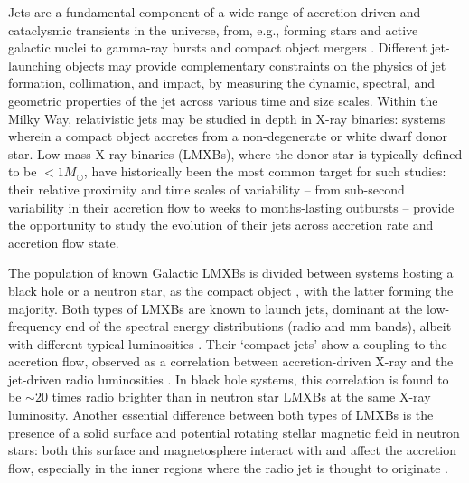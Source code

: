 \documentclass[fleqn,usenatbib]{mnras}
\begin{document}
Jets are a fundamental component of a wide range of accretion-driven and cataclysmic transients in the universe, from, e.g., forming stars \citep[see e.g.,][for reviews]{stellarjetreview1,stellarjetreview2} and active galactic nuclei \citep{blandford2019} to gamma-ray bursts \citep{kumar2015} and compact object mergers \citep{combi2023}. Different jet-launching objects may provide complementary constraints on the physics of jet formation, collimation, and impact, by measuring the dynamic, spectral, and geometric properties of the jet across various time and size scales. Within the Milky Way, relativistic jets may be studied in depth in X-ray binaries: systems wherein a compact object accretes from a non-degenerate or white dwarf donor star. Low-mass X-ray binaries (LMXBs), where the donor star is typically defined to be $<1 M_{\odot}$, have historically been the most common target for such studies: their relative proximity and time scales of variability -- from sub-second variability in their accretion flow to weeks to months-lasting outbursts -- provide the opportunity to study the evolution of their jets across accretion rate and accretion flow state. 

The population of known Galactic LMXBs is divided between systems hosting a black hole or a neutron star, as the compact object \citep{degenaarbahramian,avakyan2023,fortin2024}, with the latter forming the majority. Both types of LMXBs are known to launch jets, dominant at the low-frequency end of the spectral energy distributions (radio and mm bands), albeit with different typical luminosities \citep{fender2000,migliari06,vandeneijnden2021}. Their ‘compact jets’ show a coupling to the accretion flow, observed as a correlation between accretion-driven X-ray and the jet-driven radio luminosities \citep{hannikainen98,corbel03,gallo03,migliari06,tudor17}. In black hole systems, this correlation is found to be $\sim 20$ times radio brighter than in neutron star LMXBs at the same X-ray luminosity\citep{fender2001,gallo18}. Another essential difference between both types of LMXBs is the presence of a solid surface and potential rotating stellar magnetic field in neutron stars: both this surface and magnetosphere interact with and affect the accretion flow, especially in the inner regions where the radio jet is thought to originate \citep{blandford1982,parfrey2016}. 
\end{document}
